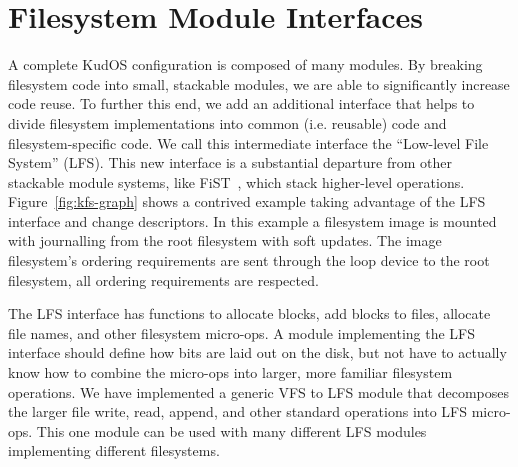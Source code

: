 \preparagraphspacing{}
\section*{Filesystem Module Interfaces}
\label{sec:interfaces}

A complete KudOS configuration is composed of many modules.
By breaking filesystem code into
small, stackable modules, we are able to significantly increase code reuse. To
further this end, we add an additional interface that helps to divide filesystem
implementations into common (i.e. reusable) code and filesystem-specific code.
We call this intermediate interface the ``Low-level File System'' (LFS). This
new interface is a substantial departure from other stackable module systems,
like FiST~\cite{zadok00fist}, which stack higher-level operations.
%
Figure~\ref{fig:kfs-graph} shows a contrived example taking advantage
of the LFS interface and change descriptors. In this example a
filesystem image is mounted with journalling from the root filesystem
with soft updates. The image filesystem's ordering requirements are
sent through the loop device to the root filesystem, all ordering
requirements are respected.

The LFS interface has functions to allocate blocks, add blocks to
files, allocate file names, and other filesystem micro-ops. A module
implementing the LFS interface should define how bits are laid out on
the disk, but not have to actually know how to combine the micro-ops
into larger, more familiar filesystem operations. We have implemented
a generic VFS to LFS module that decomposes the larger file write,
read, append, and other standard operations into LFS micro-ops. This
one module can be used with many different LFS modules implementing
different filesystems.
